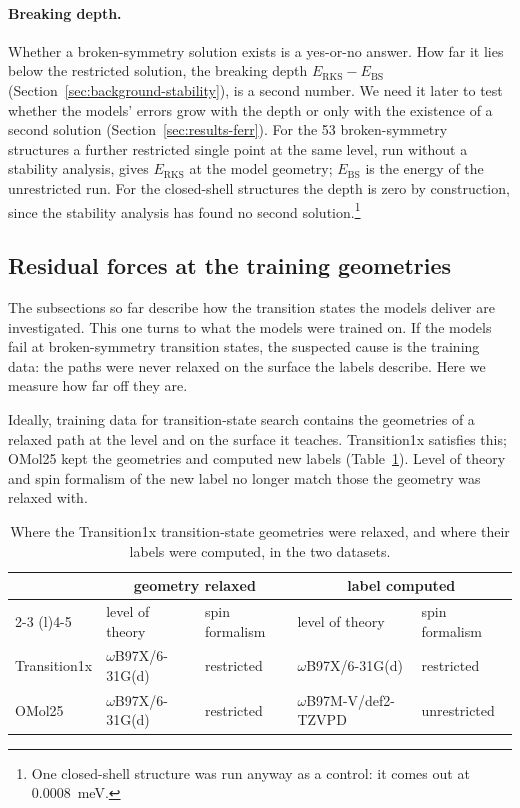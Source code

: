 \paragraph{Breaking depth.} Whether a broken-symmetry solution exists
is a yes-or-no answer. How far it lies below the restricted solution,
the breaking depth $E_\mathrm{RKS} - E_\mathrm{BS}$
(Section~\ref{sec:background-stability}), is a second number. We
need it later to test whether the models' errors grow with the depth
or only with the existence of a second solution
(Section~\ref{sec:results-ferr}). For the 53 broken-symmetry
structures a further restricted single point at the same level, run
without a stability analysis, gives $E_\mathrm{RKS}$ at the model
geometry; $E_\mathrm{BS}$ is the energy of the unrestricted run. For
the closed-shell structures the depth is zero by construction, since
the stability analysis has found no second
solution.\footnote{One closed-shell structure was run anyway as a
control: it comes out at $0.0008$~meV.}

\subsection{Residual forces at the training geometries}
\label{sec:labels}

The subsections so far describe how the transition states the models
deliver are investigated. This one turns to what the models were
trained on. If the models fail at broken-symmetry transition states,
the suspected cause is the training data: the paths were never
relaxed on the surface the labels describe. Here we measure how far
off they are.

Ideally, training data for transition-state search contains the
geometries of a relaxed path at the level and on the surface it
teaches. Transition1x satisfies this; OMol25 kept the geometries and
computed new labels (Table~\ref{tab:t1x-vs-omol-labels}). Level of
theory and spin formalism of the new label no longer match those the
geometry was relaxed with.

\begin{table}[h]
\centering
\small
\caption{Where the Transition1x transition-state geometries were
relaxed, and where their labels were computed, in the two datasets.}
\label{tab:t1x-vs-omol-labels}
\begin{tabular}{@{}lllll@{}}
\toprule
 & \multicolumn{2}{c}{geometry relaxed} & \multicolumn{2}{c}{label computed} \\
\cmidrule(lr){2-3} \cmidrule(l){4-5}
 & level of theory & spin formalism & level of theory & spin formalism \\
\midrule
Transition1x & $\omega$B97X/6-31G(d) & restricted & $\omega$B97X/6-31G(d) & restricted \\
OMol25       & $\omega$B97X/6-31G(d) & restricted & $\omega$B97M-V/def2-TZVPD & unrestricted \\
\bottomrule
\end{tabular}
\end{table}

